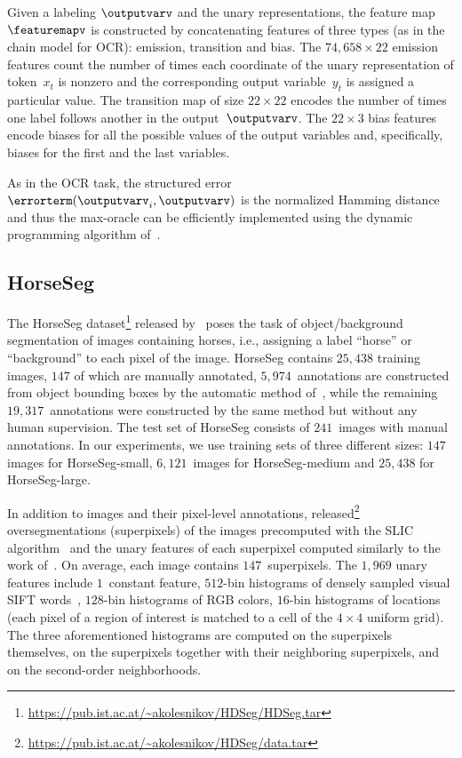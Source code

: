 \documentclass{article}
\begin{document}
%
%
%
%
%

%
%
%
%

Given a labeling $\outputvarv$ and the unary representations, the feature map $\featuremapv$ is constructed by concatenating features of three types (as in the chain model for OCR): emission, transition and bias.
The $74,658 \times 22$ emission features count the number of times each coordinate of the unary representation of token~$x_t$ is nonzero and the corresponding output variable~$y_t$ is assigned a particular value.
The transition map of size $22 \times 22$ encodes the number of times one label follows another in the output~$\outputvarv$.
The $22 \times 3$ bias features encode biases for all the possible values of the output variables and, specifically, biases for the first and the last variables.

As in the OCR task, the structured error~$\errorterm(\outputvarv_i,\outputvarv)$ is the normalized Hamming distance and thus the max-oracle can be efficiently implemented using the dynamic programming algorithm of~\citet{Viterbi67}.

\subsection{HorseSeg}
The HorseSeg dataset\footnote{\url{https://pub.ist.ac.at/~akolesnikov/HDSeg/HDSeg.tar}} released by~\citet{kolesnikov2014closed} poses the task of object/background segmentation of images containing horses, i.e., assigning a label ``horse'' or ``background'' to each pixel of the image.
HorseSeg contains $25,438$ training images, $147$ of which are manually annotated, $5,974$~annotations are constructed from object bounding boxes by the automatic method of~, while the remaining $19,317$~annotations were constructed by the same method but without any human supervision.
The test set of HorseSeg consists of $241$~images with manual annotations.
In our experiments, we use training sets of three different sizes: $147$ images for HorseSeg-small, $6,121$~images for HorseSeg-medium and $25,438$ for HorseSeg-large.
%
%

In addition to images and their pixel-level annotations, \citet{kolesnikov2014closed} released\footnote{\url{https://pub.ist.ac.at/~akolesnikov/HDSeg/data.tar}} oversegmentations (superpixels) of the images precomputed with the SLIC algorithm~ and the unary features of each superpixel computed similarly to the work of~.
On average, each image contains $147$~superpixels. The $1,969$ unary features include $1$~constant feature, $512$-bin histograms of densely sampled visual SIFT words~, $128$-bin histograms of RGB colors, $16$-bin histograms of locations (each pixel of a region of interest is matched to a cell of the $4 \times 4$ uniform grid).
The three aforementioned histograms are computed on the superpixels themselves, on the superpixels together with their neighboring superpixels, and on the second-order neighborhoods.
\end{document}
